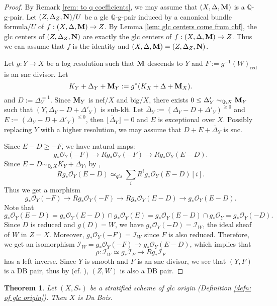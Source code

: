 \documentclass[11pt]{amsart}
\numberwithin{equation}{section}
\newcommand{\Mm}{{\bf{M}}}
\newcommand{\NN}{{\bf{N}}}
\newcommand{\Qq}{\mathbb{Q}}
\newcommand{\red}{\operatorname{red}}
\newcommand{\lf}{\lfloor}
\newcommand{\rf}{\rfloor}
\newcommand{\Oo}{\mathcal{O}}
\newtheorem{thm}{Theorem}[section]
\theoremstyle{definition}
\theoremstyle{definition}
\theoremstyle{definition}
\begin{document}
\begin{proof}
By Remark \ref{rem: to q coefficients}, we may assume that $(X,\Delta,\Mm)$ is a $\Qq$-g-pair. Let $(Z,\Delta_Z,\NN)/U$ be a glc $\mathbb Q$-g-pair induced by a canonical bundle formula$/U$ of $f: (X,\Delta,\Mm)\rightarrow Z$. By Lemma \ref{lem: glc centers come from cbf}, the glc centers of $(Z,\Delta_Z,\NN)$ are exactly the glc centers of $f: (X,\Delta,\Mm)\rightarrow Z$. Thus we can assume that $f$ is the identity and $(X,\Delta,\Mm)=(Z,\Delta_Z,\NN)$. 


Let $g:Y\to X$ be a log resolution such that $\Mm$ descends to $Y$ and $F:=g^{-1}(W)_{\red}$ is an snc divisor. Let
$$
K_Y+\Delta_Y+\Mm_Y:=g^*(K_X+\Delta+\Mm_X).
$$
and $D:=\Delta_Y^{=1}$. Since $\Mm_Y$ is nef$/X$ and big$/X$, there exists $0\le\Delta'_Y\sim_{\Qq,X}\Mm_Y$ such that $(Y,\Delta_Y-D+\Delta'_Y)$ is sub-klt. Let $\bar{\Delta}_Y:=(\Delta_Y-D+\Delta'_Y)^{\ge0}$ and $E:=(\Delta_Y-D+\Delta'_Y)^{\le 0}$, then $\lf\bar{\Delta}_Y\rf=0$ and $E$ is exceptional over $X$. Possibly replacing $Y$ with a higher resolution, we may assume that $D+E+\bar{\Delta}_Y$ is snc.


Since $E-D\ge-F$, we have natural maps:
$$
g_*\Oo_Y(-F)\to Rg_*\Oo_Y(-F)\to Rg_*\Oo_Y(E-D).
$$
Since $E-D\sim_{\Qq,X}K_Y+\bar{\Delta}_Y$, by \cite[Theorem 10.41]{Kol13},
$$
Rg_*\Oo_Y(E-D)\simeq_{qis}\sum_{i}R^ig_*\Oo_Y(E-D)[i].
$$
Thus we get a morphism 
$$
g_*\Oo_Y(-F)\to Rg_*\Oo_Y(-F)\to Rg_*\Oo_Y(E-D)\to g_*\Oo_Y(E-D).
$$
Note that 
$$
g_*\Oo_Y(E-D)=g_*\Oo_Y(E-D)\cap g_*\Oo_Y(E)=g_*\Oo_Y(E-D)\cap g_*\Oo_Y=g_*\Oo_Y(-D).
$$
Since $D$ is reduced and $g(D)=W$, we have $g_*\Oo_Y(-D)=\mathcal{I}_W$, the ideal sheaf of $W$ in $Z=X$. Moreover, $g_*\Oo_Y(-F)=\mathcal{I}_W$ since $F$ is also reduced. Therefore, we get an isomorphism $\mathcal{I}_W=g_*\Oo_Y(-F)\to g_*\Oo_Y(E-D)$, which implies that 
$$
\rho: \mathcal{I}_W\simeq g_*\mathcal{I}_F\to Rg_*\mathcal{I}_F
$$
has a left inverse. Since $Y$ is smooth and $F$ is an snc divisor, we see that $(Y,F)$ is a DB pair, thus by \cite[Theorem 3.3]{Kov12} (cf. \cite[Theorem 6.27]{Kol13}), $(Z,W)$ is also a DB pair. \end{proof}




\begin{thm}\label{thm: of glc origin implies DB}
Let $(X,S_*)$ be a stratified scheme of glc origin (Definition \ref{defn: of glc origin}). Then $X$ is Du Bois.
\end{thm}
\end{document}
